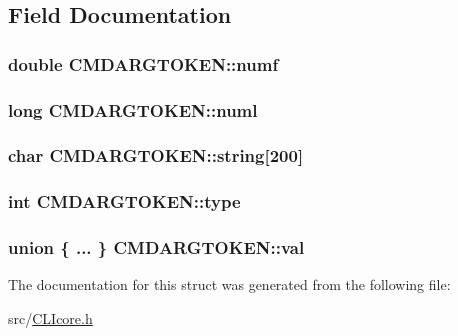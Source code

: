 \subsection{Field Documentation}
\hypertarget{structCMDARGTOKEN_a8f29c19d721dbe26248fc92c01c0e497}{
\subsubsection[{numf}]{\setlength{\rightskip}{0pt plus 5cm}double C\+M\+D\+A\+R\+G\+T\+O\+K\+E\+N\+::numf}}\label{structCMDARGTOKEN_a8f29c19d721dbe26248fc92c01c0e497}
\hypertarget{structCMDARGTOKEN_a8ef8bd8dde032f117c7c316dee08a7c9}{
\subsubsection[{numl}]{\setlength{\rightskip}{0pt plus 5cm}long C\+M\+D\+A\+R\+G\+T\+O\+K\+E\+N\+::numl}}\label{structCMDARGTOKEN_a8ef8bd8dde032f117c7c316dee08a7c9}
\hypertarget{structCMDARGTOKEN_ac74ef24422dc07823178ebbe43b7ad10}{
\subsubsection[{string}]{\setlength{\rightskip}{0pt plus 5cm}char C\+M\+D\+A\+R\+G\+T\+O\+K\+E\+N\+::string\mbox{[}200\mbox{]}}}\label{structCMDARGTOKEN_ac74ef24422dc07823178ebbe43b7ad10}
\hypertarget{structCMDARGTOKEN_a268f75c3a394c9466df7aba70dc76c00}{
\subsubsection[{type}]{\setlength{\rightskip}{0pt plus 5cm}int C\+M\+D\+A\+R\+G\+T\+O\+K\+E\+N\+::type}}\label{structCMDARGTOKEN_a268f75c3a394c9466df7aba70dc76c00}
\hypertarget{structCMDARGTOKEN_a96839ddcbefc8d1629d9be94a1319bc3}{
\subsubsection[{val}]{\setlength{\rightskip}{0pt plus 5cm}union \{ ... \}   C\+M\+D\+A\+R\+G\+T\+O\+K\+E\+N\+::val}}\label{structCMDARGTOKEN_a96839ddcbefc8d1629d9be94a1319bc3}


The documentation for this struct was generated from the following file\+:\begin{DoxyCompactItemize}
\item 
src/\hyperlink{CLIcore_8h}{C\+L\+Icore.\+h}\end{DoxyCompactItemize}
